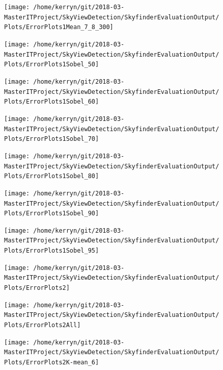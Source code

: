 \documentclass[final,3p,times,authoryear]{elsarticle}
\begin{document}
\begin{figure}
\centering
\texttt{[image: /home/kerryn/git/2018-03-MasterITProject/SkyViewDetection/SkyfinderEvaluationOutput/Plots/ErrorPlots1Mean\_7\_8\_300]}
\caption{}
\label{fig:errorplots1mean78300}
\end{figure}
\begin{figure}
\centering
\texttt{[image: /home/kerryn/git/2018-03-MasterITProject/SkyViewDetection/SkyfinderEvaluationOutput/Plots/ErrorPlots1Sobel\_50]}
\caption{}
\label{fig:errorplots1sobel50}
\end{figure}
\begin{figure}
\centering
\texttt{[image: /home/kerryn/git/2018-03-MasterITProject/SkyViewDetection/SkyfinderEvaluationOutput/Plots/ErrorPlots1Sobel\_60]}
\caption{}
\label{fig:errorplots1sobel60}
\end{figure}
\begin{figure}
\centering
\texttt{[image: /home/kerryn/git/2018-03-MasterITProject/SkyViewDetection/SkyfinderEvaluationOutput/Plots/ErrorPlots1Sobel\_70]}
\caption{}
\label{fig:errorplots1sobel70}
\end{figure}
\begin{figure}
\centering
\texttt{[image: /home/kerryn/git/2018-03-MasterITProject/SkyViewDetection/SkyfinderEvaluationOutput/Plots/ErrorPlots1Sobel\_80]}
\caption{}
\label{fig:errorplots1sobel80}
\end{figure}
\begin{figure}
\centering
\texttt{[image: /home/kerryn/git/2018-03-MasterITProject/SkyViewDetection/SkyfinderEvaluationOutput/Plots/ErrorPlots1Sobel\_90]}
\caption{}
\label{fig:errorplots1sobel90}
\end{figure}
\begin{figure}
\centering
\texttt{[image: /home/kerryn/git/2018-03-MasterITProject/SkyViewDetection/SkyfinderEvaluationOutput/Plots/ErrorPlots1Sobel\_95]}
\caption{}
\label{fig:errorplots1sobel95}
\end{figure}
\begin{figure}
\centering
\texttt{[image: /home/kerryn/git/2018-03-MasterITProject/SkyViewDetection/SkyfinderEvaluationOutput/Plots/ErrorPlots2]}
\caption{}
\label{fig:errorplots2}
\end{figure}
\begin{figure}
\centering
\texttt{[image: /home/kerryn/git/2018-03-MasterITProject/SkyViewDetection/SkyfinderEvaluationOutput/Plots/ErrorPlots2All]}
\caption{}
\label{fig:errorplots2all}
\end{figure}
\begin{figure}
\centering
\texttt{[image: /home/kerryn/git/2018-03-MasterITProject/SkyViewDetection/SkyfinderEvaluationOutput/Plots/ErrorPlots2K-mean\_6]}
\caption{}
\label{fig:errorplots2k-mean6}
\end{figure}
\end{document}
